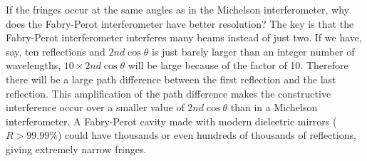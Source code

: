 \documentclass[]{manual}
\begin{document}
    If the fringes occur at the same angles as in the Michelson interferometer, why does the Fabry-Perot interferometer have better resolution?
    The key is that the Fabry-Perot interferometer interferes many beams instead of just two.
    If we have, say, ten reflections and $2nd \cos{\theta}$ is just barely larger than an integer number of wavelengths, $10 \times 2nd \cos{\theta}$ will be large because of the factor of 10.
    Therefore there will be a large path difference between the first reflection and the last reflection.
    This amplification of the path difference makes the constructive interference occur over a smaller value of $2nd \cos{\theta}$ than in a Michelson interferometer.
    A Fabry-Perot cavity made with modern dielectric mirrors ($R > 99.99\%$) could have thousands or even hundreds of thousands of reflections, giving extremely narrow fringes.
\end{document}
